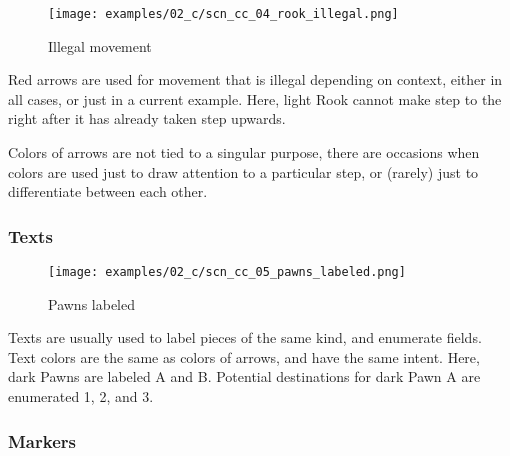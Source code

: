 \vspace*{6.7\baselineskip}
\noindent
\begin{wrapfigure}[13]{l}{0.4\textwidth}
\centering
\texttt{[image: examples/02\_c/scn\_cc\_04\_rook\_illegal.png]}
\vspace*{-1.4\baselineskip}
\caption{Illegal movement}
\label{fig:scn_cc_04_rook_illegal}
\end{wrapfigure}
Red arrows are used for movement that is illegal depending on context, either
in all cases, or just in a current example. \newline
\indent
Here, light Rook cannot make step to the right after it has already taken step
upwards.

Colors of arrows are not tied to a singular purpose, there are occasions when
colors are used just to draw attention to a particular step, or (rarely) just
to differentiate between each other.

\clearpage %

\subsubsection*{Texts}
\label{sec:Classical Chess/Chessboard/Examples/Texts}

\vspace*{-0.7\baselineskip}
\noindent
\begin{wrapfigure}[9]{l}{0.4\textwidth}
\centering
\texttt{[image: examples/02\_c/scn\_cc\_05\_pawns\_labeled.png]}
\vspace*{-1.4\baselineskip}
\caption{Pawns labeled}
\label{fig:scn_cc_05_pawns_labeled}
\end{wrapfigure}
Texts are usually used to label pieces of the same kind, and enumerate fields.
Text colors are the same as colors of arrows, and have the same intent. \newline
\indent
Here, dark Pawns are labeled A and B. Potential destinations for dark Pawn A are
enumerated 1, 2, and 3.

\vspace*{1.7\baselineskip}
\subsubsection*{Markers}
\label{sec:Classical Chess/Chessboard/Examples/Markers}


